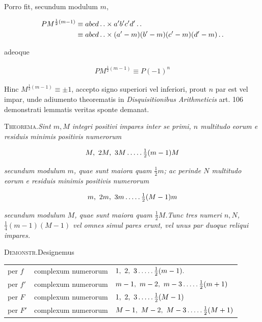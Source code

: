 Porro fit, secundum modulum $m$,

\[
\begin{aligned}
PM^{\frac12(m-1)}&\equiv abcd\mathinner{.\,.}\times a'b'c'd'\mathinner{.\,.}\\&\equiv abcd\mathinner{.\,.}\times(a'-m)(b'-m)(c'-m)(d'-m)\mathinner{.\,.}
\end{aligned}
\]

adeoque

\[
\begin{aligned}
PM^{\frac12(m-1)}\equiv P(-1)^n
\end{aligned}
\]

Hinc $M^{\frac12(m-1)}\equiv\pm1$, accepto signo superiori vel inferiori, prout $n$ par est vel impar, unde adiumento theorematis in \textit{Disquisitionibus Arithmeticis} art. 106 demonstrati lemmatis veritas sponte demanat.

%

\textsc{Theorema.}\quad \textit{Sint $m,M$ integri positivi impares inter se primi, $n$ multitudo} \textit{eorum e residuis minimis positivis numerorum}

\[
\begin{aligned}
M,\ 2M,\ 3M\mathinner{.\,.\,.\,.\,.}\tfrac12(m-1)M
\end{aligned}
\]

\textit{secundum modulum $m$, quae sunt maiora quam $\frac12m$; ac perinde $N$ multitudo eorum} \textit{e residuis minimis positivis numerorum}

\[
\begin{aligned}
m,\ 2m,\ 3m\mathinner{.\,.\,.\,.\,.}\tfrac12(M-1)m
\end{aligned}
\]

\textit{secundum modulum $M$, quae sunt maiora quam $\frac12M$.\quad Tunc tres numeri $n,N$,} \textit{$\frac14(m-1)(M-1)$ vel omnes simul pares erunt, vel unus par duoque reliqui impares.}

\textsc{Demonstr.}\quad Designemus

{\small
\begin{center}\setlength{\tabcolsep}{3pt}
\begin{tabular}{@{}lll@{}}
per $f$ & complexum numerorum & $1,\ 2,\ 3\dotsfive\frac12(m-1)\mathord{.}$ \\
per $f'$ & complexum numerorum & $m-1,\ m-2,\ m-3\dotsfive\frac12(m+1)$ \\
per $F$ & complexum numerorum & $1,\ 2,\ 3\dotsfive\frac12(M-1)$ \\
per $F'$ & complexum numerorum & $M-1,\ M-2,\ M-3\dotsfive\frac12(M+1)$
\end{tabular}\end{center}
}

